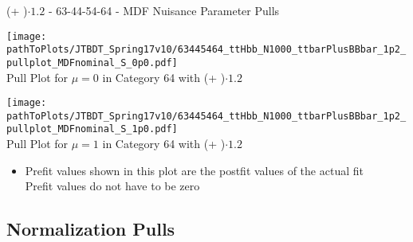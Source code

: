 \begin{frame}{(\ttbar + \bbbar)$\cdot \num[round-precision=1]{1.2}$ - 63-44-54-64 - MDF Nuisance Parameter Pulls}
\vskip -0.3cm


\begin{minipage}{0.4\textwidth}
\begin{center}
\texttt{[image: \\pathToPlots/JTBDT\_Spring17v10/63445464\_ttHbb\_N1000\_ttbarPlusBBbar\_1p2\_pullplot\_MDFnominal\_S\_0p0.pdf]}\\
Pull Plot for $\mu = 0$ in Category 64 with (\ttbar + \bbbar)$\cdot \num[round-precision=1]{1.2}$
\end{center}

\end{minipage}
\hfill
\begin{minipage}{0.4\textwidth}
\begin{center}
\texttt{[image: \\pathToPlots/JTBDT\_Spring17v10/63445464\_ttHbb\_N1000\_ttbarPlusBBbar\_1p2\_pullplot\_MDFnominal\_S\_1p0.pdf]}\\
Pull Plot for $\mu = 1$ in Category 64 with (\ttbar + \bbbar)$\cdot \num[round-precision=1]{1.2}$
\end{center}


\end{minipage}



\begin{itemize}
\item Prefit values shown in this plot are the postfit values of the actual fit\\
\rar Prefit values do not have to be zero
\end{itemize}


\end{frame}

\subsection{Normalization Pulls}


